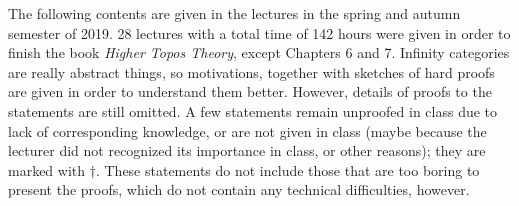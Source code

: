 The following contents are given in the lectures in the spring and autumn semester of 2019. 28 lectures with a total time of 142 hours 
were given in order to finish the book \textit{Higher Topos Theory}, except Chapters 6 and 7. Infinity categories are
really abstract things, so motivations, together with sketches of hard proofs are given in order to understand them better. 
However, details of proofs to the statements are still omitted. A few statements 
remain unproofed in class due to lack of corresponding knowledge, or are not given in class (maybe because the lecturer did not recognized
its importance in class, or other reasons); they are marked with $\dagger$. These statements do not include 
those that are too boring to present the proofs, which do not contain any technical difficulties, however. 